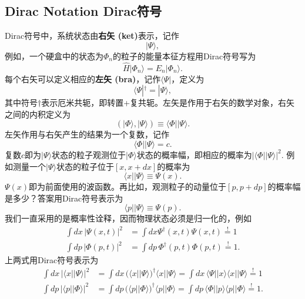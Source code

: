 \subsection[Dirac符号]{Dirac Notation \quad Dirac符号}\label{sec8.5.3}
Dirac符号中，系统状态由{\bf 右矢 (ket)}表示，记作
\begin{equation}
\label{equ8.34}
	|\Psi \rangle,
\end{equation}
例如，一个硬盒中的状态为$\Phi_n$的粒子的能量本征方程用Dirac符号写为
\[
	\hat{H} |\Phi_n \rangle = E_n |\Phi_n \rangle.
\]
每个右矢可以定义相应的{\bf 左矢 (bra)}，记作$\langle \Psi|$，定义为
\begin{equation}
\label{equ8.35}
	\langle \Psi|^\dag = |\Psi \rangle,
\end{equation}
其中符号$\dag$表示厄米共轭，即转置+复共轭。左矢是作用于右矢的数学对象，右矢之间的内积定义为
\[
	(|\Phi \rangle, |\Psi \rangle) \equiv \langle \Phi | | \Psi \rangle.
\]
左矢作用与右矢产生的结果为一个复数，记作
\begin{equation}
\label{equ8.36}
	\langle \Phi || \Psi \rangle = c.
\end{equation}
复数$c$即为$|\Psi \rangle$状态的粒子观测位于$|\Phi\rangle$状态的概率幅，即相应的概率为$| \langle \Phi || \Psi \rangle |^2$. 例如测量一个$|\Psi \rangle$状态的粒子位于$[x, x + dx]$的概率为
\[
	\langle x | | \Psi \rangle \equiv \Psi(x).
\]
$\Psi(x)$即为前面使用的波函数。再比如，观测粒子的动量位于$[p, p + dp]$的概率幅是多少？答案用Dirac符号表示为
\[
	\langle p || \Psi \rangle \equiv \Psi(p).
\]
我们一直采用的是概率性诠释，因而物理状态必须是归一化的，例如 
\begin{align}
\label{equ8.37}
	\int dx\, |\Psi(x, t)|^2 &= \int dx \Psi^\dag(x, t) \Psi(x, t) \stackrel{!}{=} 1 \\
\label{equ8.38}
	\int dp\, |\Phi (p, t)|^2 &= \int dp\, \Phi^\dag (p, t) \Phi(p, t) \stackrel{!}{=} 1.
\end{align}
上两式用Dirac符号表示为
\begin{align}
\label{equ8.39}
	\int dx\, | \langle x||\Psi \rangle|^2 &= \int dx\, \big( \langle x||\Psi \rangle \big)^\dag \langle x|| \Psi \rangle = \int dx\, \langle \Psi || x \rangle \langle x|| \Psi \rangle \stackrel{!}{=} 1 \\
\label{equ8.40}
	\int dp\, | \langle p||\Phi \rangle|^2 &= \int dp\, \big( \langle p||\Phi \rangle \big)^\dag \langle p|| \Phi \rangle = \int dp\, \langle \Phi || p \rangle \langle p|| \Phi \rangle \stackrel{!}{=} 1.
\end{align}
